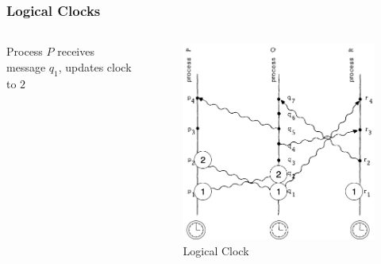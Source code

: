 \documentclass{beamer}
\begin{document}
\frame
{
	\frametitle{Logical Clocks}

	\begin{columns}
	\begin{column}{0.6\textwidth}

		Process $P$ receives message $q_1$, updates clock to $2$


	\end{column}
	\begin{column}{0.4\textwidth}

		\begin{figure}[ht!]
		\includegraphics[width=\textwidth]{files/ClockDist-Impl-Logical-Clock-2.png}
		\caption{Logical Clock}
		\end{figure}


	\end{column}
	\end{columns}


}
\end{document}
